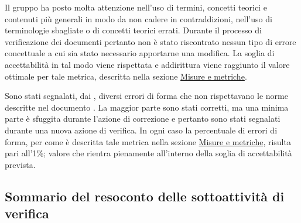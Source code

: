 \documentclass[a4paper, titlepage]{article}
\begin{document}
Il gruppo ha posto molta attenzione nell'uso di termini, concetti teorici e contenuti più generali in modo da non cadere in contraddizioni, nell'uso di terminologie sbagliate o di concetti teorici errati. Durante il processo di verificazione dei documenti pertanto non è stato riscontrato nessun tipo di errore concettuale a cui sia stato necessario apportarne una modifica. 
\newline La soglia di accettabilità in tal modo viene rispettata e addirittura viene raggiunto il valore ottimale per tale metrica, descritta nella  sezione \hyperref[sec:metr]{Misure e metriche}.

Sono stati segnalati, dai , diversi errori di forma che non rispettavano le norme descritte nel documento . La maggior parte sono stati corretti, ma una minima parte è sfuggita durante l'azione di correzione e pertanto sono stati segnalati durante una nuova azione di verifica.
\newline In ogni caso la percentuale di errori di forma, per come è descritta tale metrica nella sezione \hyperref[sec:metr]{Misure e metriche}, risulta pari all'1\%; valore che rientra pienamente all'interno della soglia di accettabilità prevista.
\newpage
\subsection {Sommario del resoconto delle sottoattività di verifica}
\end{document}
